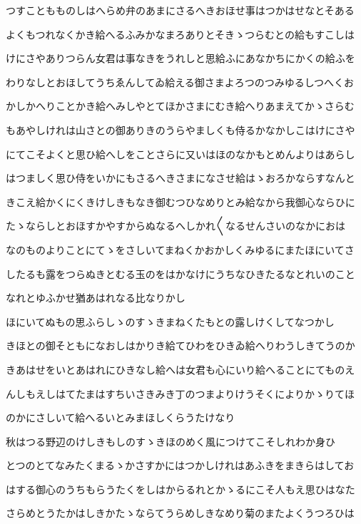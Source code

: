 \documentclass[a4paper,11pt,landscape]{ltjtarticle}
\begin{document}
つすこともものしはへらめ弁のあまにさるへきおほせ事はつかはせなとそある
\par\medskip
よくもつれなくかき給へるふみかなまろありとそきゝつらむとの給もすこしは
\par\medskip
けにさやありつらん女君は事なきをうれしと思給ふにあなかちにかくの給ふを
\par\medskip
わりなしとおほしてうちゑんしてゐ給える御さまよろつのつみゆるしつへくお
\par\medskip
かしかへりことかき給へみしやとてほかさまにむき給へりあまえてかゝさらむ
\par\medskip
もあやしけれは山さとの御ありきのうらやましくも侍るかなかしこはけにさや
\par\medskip
にてこそよくと思ひ給へしをことさらに又いはほのなかもとめんよりはあらし
\par\medskip
はつましく思ひ侍をいかにもさるへきさまになさせ給はゝおろかならすなんと
\par\medskip
きこえ給かくにくきけしきもなき御むつひなめりとみ給なから我御心ならひに
\par\medskip
たゝならしとおほすかやすからぬなるへしかれ〱なるせんさいのなかにおは
\par\medskip
なのものよりことにてゝをさしいてまねくかおかしくみゆるにまたほにいてさ
\par\medskip
したるも露をつらぬきとむる玉のをはかなけにうちなひきたるなとれいのこと
\par\medskip
なれとゆふかせ猶あはれなる比なりかし
\par\medskip
ほにいてぬもの思ふらしゝのすゝきまねくたもとの露しけくしてなつかし
\par\medskip
きほとの御そともになおしはかりき給てひわをひきゐ給へりわうしきてうのか
\par\medskip
きあはせをいとあはれにひきなし給へは女君も心にいり給へることにてものえ
\par\medskip
んしもえしはてたまはすちいさきみき丁のつまよりけうそくによりかゝりてほ
\par\medskip
のかにさしいて給へるいとみまほしくらうたけなり
\par\medskip
秋はつる野辺のけしきもしのすゝきほのめく風につけてこそしれわか身ひ
\par\medskip
とつのとてなみたくまるゝかさすかにはつかしけれはあふきをまきらはしてお
\par\medskip
はする御心のうちもらうたくをしはからるれとかゝるにこそ人もえ思ひはなた
\par\medskip
さらめとうたかはしきかたゝならてうらめしきなめり菊のまたよくうつろひは
\end{document}
